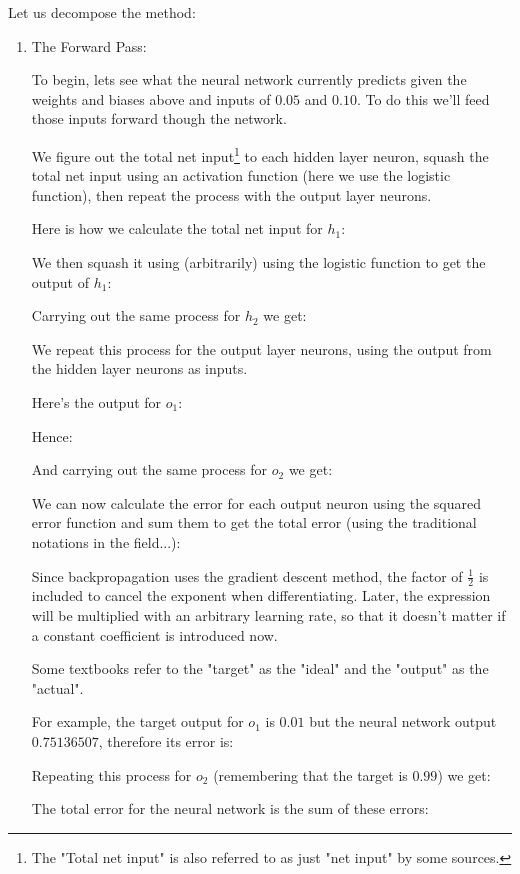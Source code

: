 	Let us decompose the method:
	\begin{enumerate}
		\item The Forward Pass:
		
		To begin, lets see what the neural network currently predicts given the weights and biases above and inputs of $0.05$ and $0.10$. To do this we'll feed those inputs forward though the network.

		We figure out the total net input\footnote{The "Total net input" is also referred to as just "net input" by some sources.} to each hidden layer neuron, squash the total net input using an activation function (here we use the logistic function), then repeat the process with the output layer neurons.
		
		Here is how we calculate the total net input for $h_1$:
		
		We then squash it using (arbitrarily) using the logistic function to get the output of $h_1$:
		
		Carrying out the same process for $h_2$ we get:
		
		We repeat this process for the output layer neurons, using the output from the hidden layer neurons as inputs.
		
		Here's the output for $o_1$:
		
		Hence:
		
		And carrying out the same process for $o_2$ we get:
		
		We can now calculate the error for each output neuron using the squared error function and sum them to get the total error (using the traditional notations in the field...):
		
		Since backpropagation uses the gradient descent method, the factor of $\frac {1}{2}$ is included to cancel the exponent when differentiating. Later, the expression will be multiplied with an arbitrary learning rate, so that it doesn't matter if a constant coefficient is introduced now.
		\begin{tcolorbox}[title=Remark,colframe=black,arc=10pt]
		Some textbooks refer to the "target" as the "ideal" and the "output" as the "actual".
		\end{tcolorbox}
		For example, the target output for $o_1$ is $0.01$ but the neural network output $0.75136507$, therefore its error is:
		
		Repeating this process for $o_2$ (remembering that the target is $0.99$) we get:
		
		The total error for the neural network is the sum of these errors:
		

\end{enumerate}
